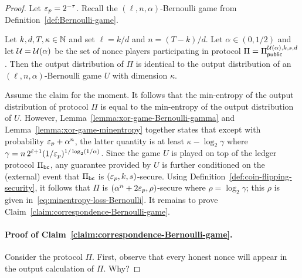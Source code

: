 \begin{proof}
  Let $\mathsf{\varepsilon}_p = 2^{-\tau}$. 
  Recall the $(\ell, n, \alpha)$-Bernoulli game from Definition~\ref{def:Bernoulli-game}.
  \begin{claim}\label{claim:correspondence-Bernoulli-game}
    Let $k, d, T, \kappa \in \mathbb{N}$ and set $\ell = k/d$ and $n = (T - k)/d$. 
    Let $\alpha \in (0, 1/2)$ and  
    let $\mathcal{U} = \mathcal{U}(\alpha)$ be the set of nonce players 
    participating in protocol $\Pi = \Pi_\mathsf{public}^{\mathcal{U}(\alpha),k,s,d}$. 
    Then the output distribution of $\Pi$ 
    is identical to 
    the output distribution of 
    an $(\ell, n, \alpha)$-Bernoulli game $U$ with dimension $\kappa$.
  \end{claim}

  Assume the claim for the moment. 
  It follows 
  that the 
  min-entropy of the output distribution of 
  protocol $\Pi$ 
  is equal to 
  the min-entropy of the output distribution of $U$. 
  However, 
  Lemma~\ref{lemma:xor-game-Bernoulli-gamma} and 
  Lemma~\ref{lemma:xor-game-minentropy} together 
  states that 
  except with probability $\mathsf{\varepsilon}_p  +\alpha^n$, 
  the latter quantity is at least $\kappa - \log_2 \gamma$ 
  where $\gamma = n\,2^{\ell + 1} (1/\mathsf{\varepsilon}_p)^{1/\log_2(1/\alpha)}$.
  Since the game $U$ is played on top of 
  the ledger protocol $\Pi_\mathsf{bc}$, 
  any guarantee provided by $U$ is 
  further conditioned on the (external) event that 
  $\Pi_\mathsf{bc}$ is $(\mathsf{\varepsilon}_p, k, s)$-secure. 
  Using Definition~\ref{def:coin-flipping-security}, 
  it follows that $\Pi$ is $(\alpha^n + 2 \mathsf{\varepsilon}_p, \rho)$-secure 
  where $\rho = \log_2 \gamma$; 
  this $\rho$ is given in~\eqref{eq:minentropy-loss-Bernoulli}. 
  It remains to prove Claim~\ref{claim:correspondence-Bernoulli-game}.

  \paragraph{Proof of Claim~\ref{claim:correspondence-Bernoulli-game}.}

    Consider the protocol $\Pi$. 
    First, observe that every honest nonce will 
    appear in the output calculation of $\Pi$. 
    {\color{red}Why?}



\end{proof}
